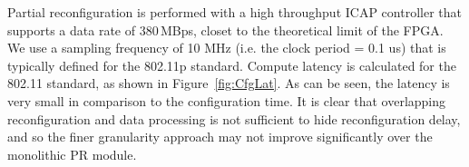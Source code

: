 Partial reconfiguration is performed with a high throughput ICAP controller that supports a data rate of 380\,MBps, closet to the theoretical limit of the FPGA.
We use a sampling frequency of 10 MHz (i.e. the clock period = 0.1 us) that is typically defined for the 802.11p standard. %
Compute latency is calculated for the 802.11 standard, as shown in Figure~\ref{fig:CfgLat}.
As can be seen, the latency is very small in comparison to the configuration time.%
It is clear that overlapping reconfiguration and data processing is not sufficient to hide reconfiguration delay, and so the finer granularity approach may not improve significantly over the monolithic PR module.
